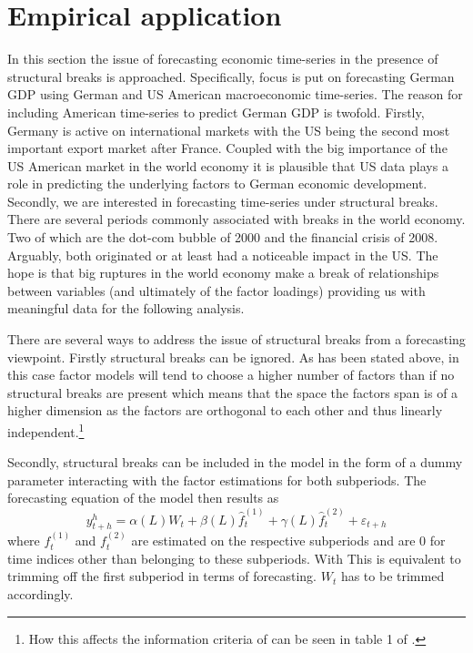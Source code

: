 \documentclass[12pt]{article}
\begin{document}
\section{Empirical application}
In this section the issue of forecasting economic time-series in the presence of structural breaks is approached. Specifically, focus is put on forecasting German GDP using German and US American macroeconomic time-series. The reason for including American time-series to predict German GDP is twofold. Firstly, Germany is active on international markets with the US being the second most important export market after France. Coupled with the big importance of the US American market in the world economy it is plausible that US data plays a role in predicting the underlying factors to German economic development. Secondly, we are interested in forecasting time-series under structural breaks. There are several periods commonly associated with breaks in the world economy. Two of which are the dot-com bubble of 2000 and the financial crisis of 2008. Arguably, both originated or at least had a noticeable impact in the US. The hope is that big ruptures in the world economy make a break of relationships between variables (and ultimately of the factor loadings) providing us with meaningful data for the following analysis.

There are several ways to address the issue of structural breaks from a forecasting viewpoint. Firstly structural breaks can be ignored. As has been stated above, in this case factor models will tend to choose a higher number of factors than if no structural breaks are present which means that the space the factors span is of a higher dimension as the factors are orthogonal to each other and thus linearly independent.\footnote{How this affects the information criteria of \citet{bai2002determining} can be seen in table 1 of \citet{breitung2011testing}.}

Secondly, structural breaks can be included in the model in the form of a dummy parameter interacting with the factor estimations for both subperiods. The forecasting equation of the model then results as
\begin{equation}
	\label{forecasting, structural breaks}
	y^h_{t+h} = \alpha(L) W_t + \beta(L) \hat f_t^{(1)} + \gamma(L) \hat f_t^{(2)} + \varepsilon_{t+h}
\end{equation}
where $f_t^{(1)}$ and $f_t^{(2)}$ are estimated on the respective subperiods and are $0$ for time indices other than belonging to these subperiods. With This is equivalent to trimming off the first subperiod in terms of forecasting. $W_t$ has to be trimmed accordingly.
\end{document}
